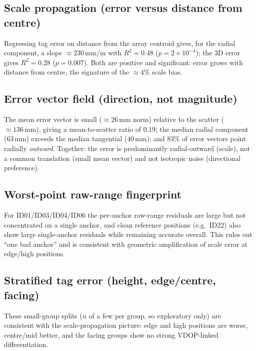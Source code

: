 \documentclass[11pt,a4paper]{article}
\newcommand{\mm}{\,\si{\milli\meter}}
\begin{document}
\subsection{Scale propagation (error versus distance from centre)}
Regressing tag error on distance from the array centroid gives, for the radial component, a
slope $\approx\!230\mm/\text{m}$ with $R^2=0.48$ ($p=2\times10^{-4}$); the 3D error gives
$R^2=0.28$ ($p=0.007$). Both are positive and significant: error grows with distance from
centre, the signature of the $\approx\!4\%$ scale bias.

\subsection{Error vector field (direction, not magnitude)}
The mean error vector is small ($\approx\!26\mm$ norm) relative to the scatter
($\approx\!136\mm$), giving a mean-to-scatter ratio of $0.19$; the median radial component
($63\mm$) exceeds the median tangential ($40\mm$); and $83\%$ of error vectors point radially
\emph{outward}. Together: the error is predominantly radial-outward (scale), not a common
translation (small mean vector) and not isotropic noise (directional preference).

\subsection{Worst-point raw-range fingerprint}
For ID01/ID03/ID04/ID06 the per-anchor raw-range residuals are large but not concentrated on
a single anchor, and clean reference positions (e.g.\ ID22) also show large single-anchor
residuals while remaining accurate overall. This rules out ``one bad anchor'' and is
consistent with geometric amplification of scale error at edge/high positions.

\subsection{Stratified tag error (height, edge/centre, facing)}
These small-group splits ($n$ of a few per group, so exploratory only) are consistent with
the scale-propagation picture: edge and high positions are worse, centre/mid better, and the
facing groups show no strong VDOP-linked differentiation.
\end{document}
